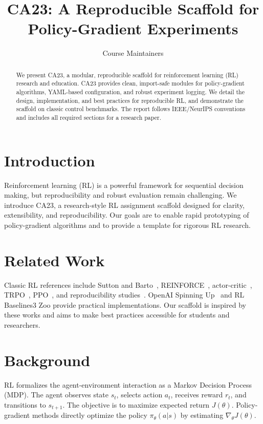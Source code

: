 \documentclass[conference]{IEEEtran}
\title{CA23: A Reproducible Scaffold for Policy-Gradient Experiments}
\author{Course Maintainers}
\date{}
\begin{document}
\maketitle

\begin{abstract}
We present CA23, a modular, reproducible scaffold for reinforcement learning (RL) research and education. CA23 provides clean, import-safe modules for policy-gradient algorithms, YAML-based configuration, and robust experiment logging. We detail the design, implementation, and best practices for reproducible RL, and demonstrate the scaffold on classic control benchmarks. The report follows IEEE/NeurIPS conventions and includes all required sections for a research paper.
\end{abstract}

\section{Introduction}
Reinforcement learning (RL) is a powerful framework for sequential decision making, but reproducibility and robust evaluation remain challenging. We introduce CA23, a research-style RL assignment scaffold designed for clarity, extensibility, and reproducibility. Our goals are to enable rapid prototyping of policy-gradient algorithms and to provide a template for rigorous RL research.

\section{Related Work}
Classic RL references include Sutton and Barto~\cite{sutton_barto}, REINFORCE~\cite{williams1992simple}, actor-critic~\cite{konda2000actor}, TRPO~\cite{schulman2015trust}, PPO~\cite{schulman2017proximal}, and reproducibility studies~\cite{henderson2018deep}. OpenAI Spinning Up~\cite{spinup} and RL Baselines3 Zoo provide practical implementations. Our scaffold is inspired by these works and aims to make best practices accessible for students and researchers.

\section{Background}
RL formalizes the agent-environment interaction as a Markov Decision Process (MDP). The agent observes state $s_t$, selects action $a_t$, receives reward $r_t$, and transitions to $s_{t+1}$. The objective is to maximize expected return $J(\theta)$. Policy-gradient methods directly optimize the policy $\pi_\theta(a|s)$ by estimating $\nabla_\theta J(\theta)$.
\end{document}
